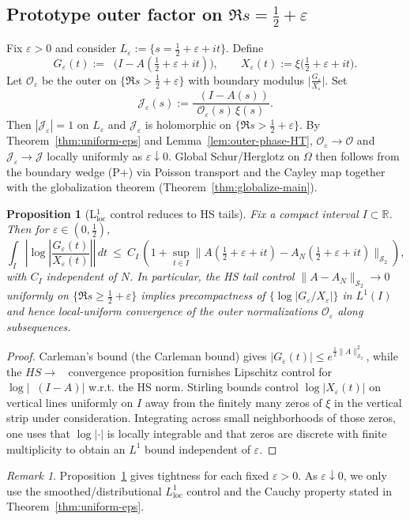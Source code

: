 \documentclass[11pt]{article}
\newtheorem{proposition}[theorem]{Proposition}
\theoremstyle{definition}
\theoremstyle{remark}
\newtheorem{remark}[theorem]{Remark}
\newcommand{\HS}{\mathcal{S}_2}
\DeclareMathOperator{\dettwo}{det_2}
\begin{document}
\subsection{Prototype outer factor on \(\Re s=\tfrac12+\varepsilon\)}\label{subsec:outer-prototype}
Fix \(\varepsilon>0\) and consider \(L_{\varepsilon}:=\{s=\tfrac12+\varepsilon+it\}\). Define
\[
 G_{\varepsilon}(t):=\dettwo\big(I-A(\tfrac12+\varepsilon+it)\big),\qquad X_{\varepsilon}(t):=\xi\big(\tfrac12+\varepsilon+it\big).
\]
Let \(\mathcal O_{\varepsilon}\) be the outer on \(\{\Re s>\tfrac12+\varepsilon\}\) with boundary modulus \(\big|\frac{G_{\varepsilon}}{X_{\varepsilon}}\big|\). Set
\[
 \mathcal J_{\varepsilon}(s):=\frac{\dettwo(I-A(s))}{\mathcal O_{\varepsilon}(s)\,\xi(s)}.
\]
Then \(|\mathcal J_{\varepsilon}|=1\) on \(L_{\varepsilon}\) and \(\mathcal J_{\varepsilon}\) is holomorphic on \(\{\Re s>\tfrac12+\varepsilon\}\). By Theorem~\ref{thm:uniform-eps} and Lemma~\ref{lem:outer-phase-HT}, \(\mathcal O_{\varepsilon}\to\mathcal O\) and \(\mathcal J_{\varepsilon}\to\mathcal J\) locally uniformly as \(\varepsilon\downarrow 0\). Global Schur/Herglotz on \(\Omega\) then follows from the boundary wedge (P+) via Poisson transport and the Cayley map together with the globalization theorem (Theorem~\ref{thm:globalize-main}).
\begin{proposition}[L$^1_{\mathrm{loc}}$ control reduces to HS tails]\label{prop:L1loc}
Fix a compact interval $I\subset\mathbb R$. Then for \(\varepsilon\in(0,\tfrac12)\),
\[
 \int_{I}\left|\log\left|\frac{G_{\varepsilon}(t)}{X_{\varepsilon}(t)}\right|\right|\,dt\ \le\ C_I\,\left(1+\sup_{t\in I}\|A(\tfrac12+\varepsilon+it)-A_N(\tfrac12+\varepsilon+it)\|_{\HS}\right),
\]
with $C_I$ independent of $N$. In particular, the HS tail control $\|A-A_N\|_{\HS}\to 0$ uniformly on \(\{\Re s\ge \tfrac12+\varepsilon\}\) implies precompactness of \(\{\log|G_{\varepsilon}/X_{\varepsilon}|\}\) in $L^1(I)$ and hence local-uniform convergence of the outer normalizations \(\mathcal O_{\varepsilon}\) along subsequences.
\end{proposition}
\begin{proof}
Carleman's bound (the Carleman bound) gives \(|G_{\varepsilon}(t)|\le e^{\tfrac12\|A\|_{\HS}^2}\), while the \(HS\to\dettwo\) convergence proposition furnishes Lipschitz control for \(\log|\dettwo(I-A)|\) w.r.t. the HS norm. Stirling bounds control \(\log|X_{\varepsilon}(t)|\) on vertical lines uniformly on $I$ away from the finitely many zeros of \(\xi\) in the vertical strip under consideration. Integrating across small neighborhoods of those zeros, one uses that \(\log|\cdot|\) is locally integrable and that zeros are discrete with finite multiplicity to obtain an $L^1$ bound independent of \(\varepsilon\).
\end{proof}
\begin{remark}
Proposition~\ref{prop:L1loc} gives tightness for each fixed \(\varepsilon>0\). As \(\varepsilon\downarrow 0\), we only use the smoothed/distributional $L^1_{\mathrm{loc}}$ control and the Cauchy property stated in Theorem~\ref{thm:uniform-eps}.
\end{remark}
\end{document}
